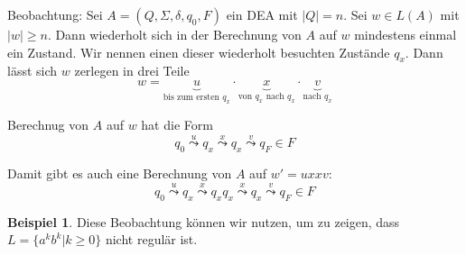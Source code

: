 \documentclass[11pt]{article} %
\theoremstyle{definition}
\newtheorem*{beispiel}{Beispiel}
\begin{document}
Beobachtung: Sei $A = (Q, \Sigma, \delta, q_0, F)$ ein DEA mit $|Q| = n$. Sei $w \in L(A)$ mit $|w| \ge n$. Dann wiederholt sich in der Berechnung von $A$ auf $w$ mindestens einmal ein Zustand. Wir nennen einen dieser wiederholt besuchten Zustände $q_x$. Dann lässt sich $w$ zerlegen in drei Teile
\[
w = \underbrace{u}_{\textrm{bis zum ersten $q_x$}} \cdot \underbrace{x}_{\textrm{von $q_x$ nach $q_x$}} \cdot \underbrace{v}_{\textrm{nach $q_x$}}
\]

Berechnug von $A$ auf $w$ hat die Form
\[
q_0 \overset{u}{\leadsto} q_x \overset{x}{\leadsto} q_x \overset{v}{\leadsto} q_F \in F
\]

Damit gibt es auch eine Berechnung von $A$ auf $w' = uxxv$:
\[
q_0 \overset{u}{\leadsto} q_x \overset{x}{\leadsto} q_x q_x \overset{x}{\leadsto} q_x \overset{v}{\leadsto} q_F \in F
\]

\begin{beispiel}
Diese Beobachtung können wir nutzen, um zu zeigen, dass $L = \{a^k b^k | k \ge 0 \}$ nicht regulär ist.
\end{beispiel}
\end{document}
